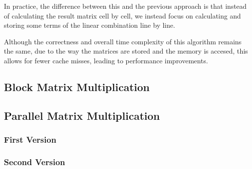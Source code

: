 In practice, the difference between this and the previous approach is that instead of calculating the result matrix cell by cell, we instead focus on calculating and storing some terms of the linear combination line by line.

Although the correctness and overall time complexity of this algorithm remains the same, due to the way the matrices are stored and the memory is accesed, this allows for fewer cache misses, leading to performance improvements.

\subsection{Block Matrix Multiplication}

\subsection{Parallel Matrix Multiplication}

\subsubsection{First Version}

\subsubsection{Second Version}


